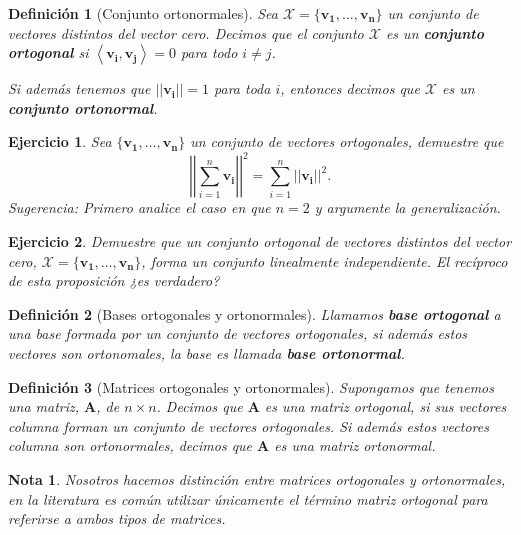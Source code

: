 \documentclass[11pt]{report}
\theoremstyle{break}
\newtheorem{definicion}{Definición}[chapter]
\newtheorem{nota}{Nota}[chapter]
\newtheorem{ejercicio}{Ejercicio}[chapter]
\theoremstyle{break}
\newcommand{\mbb}[1]{$\mathbb{#1}$}
\newcommand{\matdim}[2]{$#1 \times #2$}
\begin{document}
\begin{definicion}[Conjunto ortonormales]
Sea $\mathcal{X} = \{\bm{v_1}, \ldots, \bm{v_n} \}$ un conjunto de vectores distintos del vector cero. Decimos que el conjunto $\mathcal{X}$ es un \textbf{conjunto ortogonal} si $\left< \bm{v_i}, \bm{v_j} \right> = 0$ para todo $i \neq j$.

Si además tenemos que $||\bm{v_i}|| = 1$ para toda $i$, entonces decimos que $\mathcal{X}$ es un \textbf{conjunto ortonormal}.
\end{definicion}

\begin{ejercicio}
Sea $\{\bm{v_1}, \ldots, \bm{v_n} \}$ un conjunto de vectores ortogonales, demuestre que
$$ \left| \left| \sum_{i = 1}^{n} \bm{v_i} \right| \right|^{2} = \sum_{i = 1}^{n}||\bm{v_i}||^{2}.$$
Sugerencia: Primero analice el caso en que $n = 2$ y argumente la generalización.
\end{ejercicio}

\begin{ejercicio}
Demuestre que un conjunto ortogonal de vectores distintos del vector cero, $\mathcal{X} = \{\bm{v_1}, \ldots, \bm{v_n} \}$, forma un conjunto linealmente independiente. El recíproco de esta proposición ¿es verdadero? \newline
\end{ejercicio}

\begin{definicion}[Bases ortogonales y ortonormales]
Llamamos \textbf{base ortogonal} a una base formada por un conjunto de vectores ortogonales, si además estos vectores son ortonomales, la base es llamada \textbf{base ortonormal}.
\end{definicion}

\begin{definicion}[Matrices ortogonales y ortonormales]
\label{definicion:matriz-ortogonal}
Supongamos que tenemos una matriz, $\bm{A}$, de \matdim{n}{n}. Decimos que $\bm{A}$ es una matriz ortogonal, si sus vectores columna forman un conjunto de vectores ortogonales.
Si además estos vectores columna son ortonormales, decimos que $\bm{A}$ es una matriz ortonormal.
\end{definicion}

\begin{nota}
\label{nota:Matrices-ortonormales}
Nosotros hacemos distinción entre matrices ortogonales y ortonormales, en la literatura es común utilizar únicamente el término matriz ortogonal para referirse a ambos tipos de matrices.
\end{nota}
\end{document}
